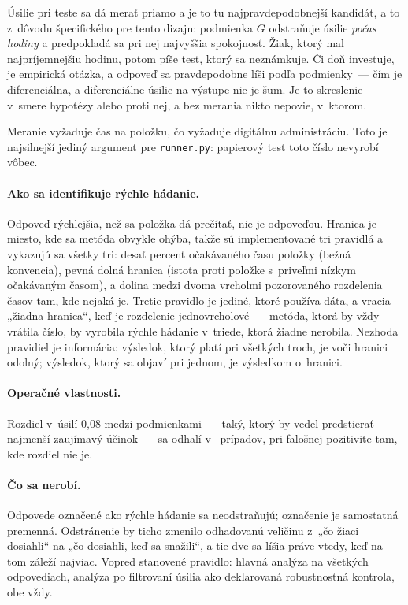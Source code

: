 Úsilie pri teste sa dá merať priamo a je to tu najpravdepodobnejší kandidát, a to
z~dôvodu špecifického pre tento dizajn: podmienka $G$ odstraňuje úsilie
\emph{počas hodiny} a predpokladá sa pri nej najvyššia spokojnosť. Žiak, ktorý mal
najpríjemnejšiu hodinu, potom píše test, ktorý sa neznámkuje. Či doň investuje, je
empirická otázka, a odpoveď sa pravdepodobne líši podľa podmienky~--- čím je
diferenciálna, a diferenciálne úsilie na výstupe nie je šum. Je to skreslenie
v~smere hypotézy alebo proti nej, a bez merania nikto nepovie, v~ktorom.

Meranie vyžaduje čas na položku, čo vyžaduje digitálnu administráciu. Toto je
najsilnejší jediný argument pre \texttt{runner.py}: papierový test toto číslo
nevyrobí vôbec.

\paragraph{Ako sa identifikuje rýchle hádanie.} Odpoveď rýchlejšia, než sa
položka dá prečítať, nie je odpoveďou. Hranica je miesto, kde sa metóda obvykle
ohýba, takže sú implementované tri pravidlá a vykazujú sa všetky tri: desať
percent očakávaného času položky (bežná konvencia), pevná dolná hranica (istota
proti položke s~priveľmi nízkym očakávaným časom), a dolina medzi dvoma vrcholmi
pozorovaného rozdelenia časov tam, kde nejaká je. Tretie pravidlo je jediné, ktoré
používa dáta, a vracia „žiadna hranica“, keď je rozdelenie jednovrcholové~---
metóda, ktorá by vždy vrátila číslo, by vyrobila rýchle hádanie v~triede, ktorá
žiadne nerobila. Nezhoda pravidiel je informácia: výsledok, ktorý platí pri
všetkých troch, je voči hranici odolný; výsledok, ktorý sa objaví pri jednom, je
výsledkom o~hranici.

\paragraph{Operačné vlastnosti.} Rozdiel v~úsilí 0{,}08 medzi podmienkami~--- taký,
ktorý by vedel predstierať najmenší zaujímavý účinok~--- sa odhalí
v~\asmEffortDetect{} prípadov, pri falošnej pozitivite \asmEffortFalsePos{} tam,
kde rozdiel nie je.

\paragraph{Čo sa nerobí.} Odpovede označené ako rýchle hádanie sa neodstraňujú;
označenie je samostatná premenná. Odstránenie by ticho zmenilo odhadovanú veličinu
z~„čo žiaci dosiahli“ na „čo dosiahli, keď sa snažili“, a tie dve sa líšia práve
vtedy, keď na tom záleží najviac. Vopred stanovené pravidlo: hlavná analýza na
všetkých odpovediach, analýza po filtrovaní úsilia ako deklarovaná robustnostná
kontrola, obe vždy.

